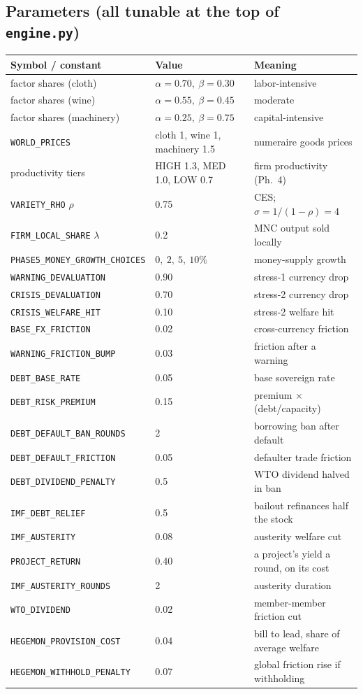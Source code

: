 \documentclass[11pt]{article}
\newcommand{\code}[1]{\texttt{#1}}
\begin{document}
\subsection{Parameters (all tunable at the top of \code{engine.py})}
\begin{center}\small
\begin{tabular}{lll}
\toprule
Symbol / constant & Value & Meaning \\
\midrule
factor shares (cloth) & $\alpha{=}0.70,\ \beta{=}0.30$ & labor-intensive \\
factor shares (wine) & $\alpha{=}0.55,\ \beta{=}0.45$ & moderate \\
factor shares (machinery) & $\alpha{=}0.25,\ \beta{=}0.75$ & capital-intensive \\
\code{WORLD\_PRICES} & cloth 1, wine 1, machinery 1.5 & numeraire goods prices \\
productivity tiers & HIGH 1.3, MED 1.0, LOW 0.7 & firm productivity (Ph.\ 4) \\
\code{VARIETY\_RHO} $\rho$ & 0.75 & CES; $\sigma = 1/(1-\rho) = 4$ \\
\code{FIRM\_LOCAL\_SHARE} $\lambda$ & 0.2 & MNC output sold locally \\
\code{PHASE5\_MONEY\_GROWTH\_CHOICES} & $0,\ 2,\ 5,\ 10\%$ & money-supply growth \\
\code{WARNING\_DEVALUATION} & 0.90 & stress-1 currency drop \\
\code{CRISIS\_DEVALUATION} & 0.70 & stress-2 currency drop \\
\code{CRISIS\_WELFARE\_HIT} & 0.10 & stress-2 welfare hit \\
\code{BASE\_FX\_FRICTION} & 0.02 & cross-currency friction \\
\code{WARNING\_FRICTION\_BUMP} & 0.03 & friction after a warning \\
\code{DEBT\_BASE\_RATE} & 0.05 & base sovereign rate \\
\code{DEBT\_RISK\_PREMIUM} & 0.15 & premium $\times$ (debt/capacity) \\
\code{DEBT\_DEFAULT\_BAN\_ROUNDS} & 2 & borrowing ban after default \\
\code{DEBT\_DEFAULT\_FRICTION} & 0.05 & defaulter trade friction \\
\code{DEBT\_DIVIDEND\_PENALTY} & 0.5 & WTO dividend halved in ban \\
\code{IMF\_DEBT\_RELIEF} & 0.5 & bailout refinances half the stock \\
\code{IMF\_AUSTERITY} & 0.08 & austerity welfare cut \\
\code{PROJECT\_RETURN} & 0.40 & a project's yield a round, on its cost \\
\code{IMF\_AUSTERITY\_ROUNDS} & 2 & austerity duration \\
\code{WTO\_DIVIDEND} & 0.02 & member-member friction cut \\
\code{HEGEMON\_PROVISION\_COST} & 0.04 & bill to lead, share of average welfare \\
\code{HEGEMON\_WITHHOLD\_PENALTY} & 0.07 & global friction rise if withholding \\
\bottomrule
\end{tabular}
\end{center}
\end{document}

